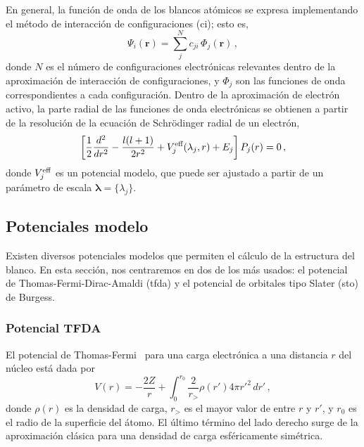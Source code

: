 En general, la función de onda de los blancos atómicos se expresa 
implementando el método de interacción de configuraciones (\acs{ci}); 
esto es,
\begin{equation*}
\Psi_i(\mathbf{r}) =
\sum_j^{N} c_{ji} \, \Phi_j(\mathbf{r})\,,
\end{equation*}
donde $N$ es el número de configuraciones electrónicas relevantes dentro
de la aproximación de interacción de configuraciones, y $\Phi_j$ son las
funciones de onda correspondientes a cada configuración. Dentro de la 
aproximación de electrón activo, la parte radial de las funciones de 
onda electrónicas se obtienen a partir de la resolución de la ecuación 
de Schr\"odinger radial de un electrón,
\begin{equation*}
\left[ \frac{1}{2} \frac{d^2}{dr^2} - \frac{l(l+1)}{2r^2} 
 + V_j^{\mbox{\scriptsize eff}}(\lambda_j,r)
 + E_j \right] P_j(r)=0\,,
\end{equation*}
donde $V_j^{\mbox{\scriptsize eff}}$ es un potencial modelo, que puede 
ser ajustado a partir de un parámetro de escala 
$\boldsymbol\lambda=\{\lambda_j\}$. 

\subsection{Potenciales modelo}

Existen diversos potenciales modelos que permiten el cálculo de la
estructura del blanco. En esta sección, nos centraremos en dos de los más 
usados: el potencial de Thomas-Fermi-Dirac-Amaldi (\acs{tfda}) y el 
potencial de orbitales tipo Slater (\acs{sto}) de Burgess. 

\subsubsection*{Potencial TFDA}

El potencial de Thomas-Fermi~\cite{Gombas:56,Eissner:69,Bautista:08} para 
una carga electrónica a una distancia $r$ del núcleo está dada por
\begin{equation}
V(r)=-\frac{2Z}{r}+\int_0^{r_0}\frac{2}{r_>} \rho(r')4\pi r'^2\,dr'\,,
\label{eq:Thomas-Fermi}
\end{equation}
donde $\rho(r)$ es la densidad de carga, $r_>$ es el mayor valor de entre
$r$ y $r'$, y $r_0$ es el radio de la superficie del átomo. El último
término del lado derecho surge de la aproximación clásica para una 
densidad de carga esféricamente simétrica. 

